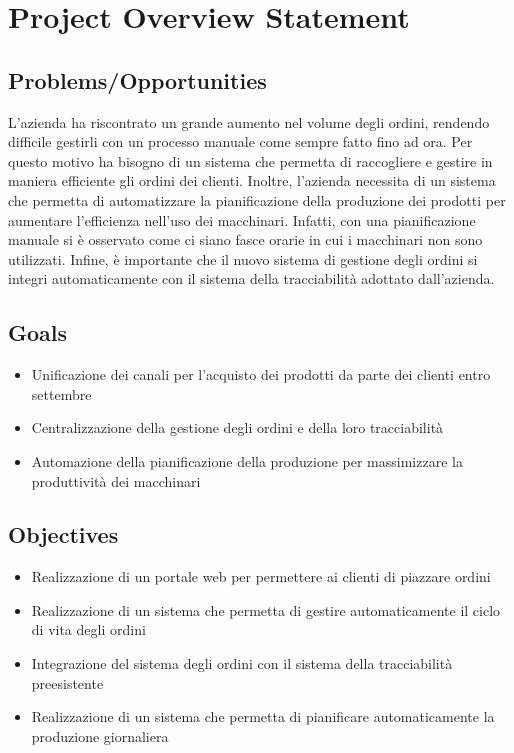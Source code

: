 \chapter{Project Overview Statement}
\label{app:pos}

\section{Problems/Opportunities}
L'azienda ha riscontrato un grande aumento nel volume degli ordini, rendendo difficile gestirli con un processo manuale come sempre fatto fino ad ora.
Per questo motivo ha bisogno di un sistema che permetta di raccogliere e gestire in maniera efficiente gli ordini dei clienti. Inoltre, l'azienda necessita di un sistema che permetta di automatizzare la pianificazione della produzione dei prodotti per aumentare l'efficienza nell'uso dei macchinari. Infatti, con una pianificazione manuale si è osservato come ci siano fasce orarie in cui i macchinari non sono utilizzati.
Infine, è importante che il nuovo sistema di gestione degli ordini si integri automaticamente con il sistema della tracciabilità adottato dall'azienda.

\section{Goals}
\begin{itemize}
  \item Unificazione dei canali per l'acquisto dei prodotti da parte dei clienti entro settembre
  \item Centralizzazione della gestione degli ordini e della loro tracciabilità
  \item Automazione della pianificazione della produzione per massimizzare la produttività dei macchinari
\end{itemize}

\section{Objectives}
\begin{itemize}
  \item Realizzazione di un portale web per permettere ai clienti di piazzare ordini
  \item Realizzazione di un sistema che permetta di gestire automaticamente il ciclo di vita degli ordini
  \item Integrazione del sistema degli ordini con il sistema della tracciabilità preesistente
  \item Realizzazione di un sistema che permetta di pianificare automaticamente la produzione giornaliera
\end{itemize}

